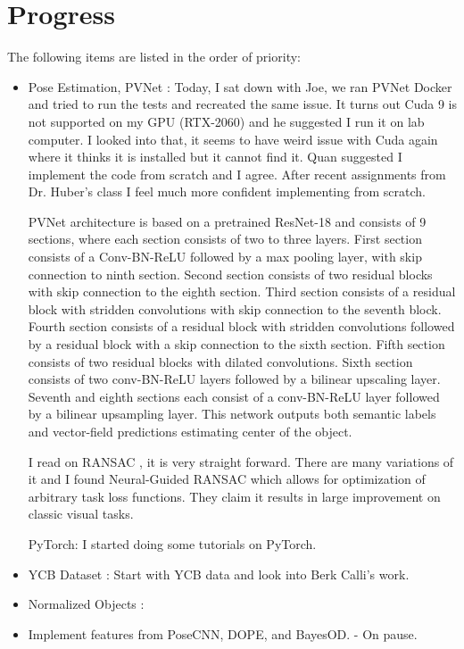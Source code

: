 \documentclass[11pt]{article}
\begin{document}
\section{Progress}
The following items are listed in the order of priority:
\begin{itemize}
      \item Pose Estimation, PVNet \cite{peng2019pvnet}: Today, I sat down with
      Joe, we ran PVNet Docker and tried to run the tests and recreated the
      same issue. It turns out Cuda 9 is not supported on my GPU (RTX-2060) and
      he suggested I run it on lab computer. I looked into that, it seems to
      have weird issue with Cuda again where it thinks it is installed but it
      cannot find it. Quan suggested I implement the code from scratch and I
      agree. After recent assignments from Dr. Huber's class I feel much more
      confident implementing from scratch.

      PVNet architecture is based on a pretrained ResNet-18 \cite{he2015deep}
      and consists of 9 sections, where each section consists of two to three
      layers. First section consists of a Conv-BN-ReLU followed by a max pooling
      layer, with skip connection to ninth section. Second section consists of
      two residual blocks with skip connection to the eighth section. Third
      section consists of a residual block with stridden convolutions with
      skip connection to the seventh block. Fourth section consists of a
      residual block with stridden convolutions followed by a residual block
      with a skip connection to the sixth section. Fifth section consists of two
      residual blocks with dilated convolutions. Sixth section consists of
      two conv-BN-ReLU layers followed by a bilinear upscaling layer. Seventh
      and eighth sections each consist of a conv-BN-ReLU layer followed by a
      bilinear upsampling layer. This network outputs both semantic labels and
      vector-field predictions estimating center of the object.


      I read on RANSAC \cite{fischler1981random}, it is very straight forward.
      There are many variations of it and I found Neural-Guided RANSAC
      \cite{brachmann2019neural} which allows for optimization of arbitrary task
      loss functions. They claim it results in large improvement on classic
      visual tasks.

      PyTorch: I started doing some tutorials on PyTorch.

      \item YCB Dataset \cite{calli2015ycb}: Start with YCB data and look into
      Berk Calli's work.
      \item Normalized Objects \cite{Wang_2019_CVPR}:
      \item Implement features from PoseCNN, DOPE, and BayesOD. - On pause.
\end{itemize}
\end{document}
